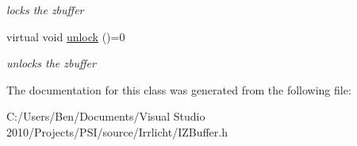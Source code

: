 \begin{DoxyCompactItemize}
\begin{DoxyCompactList}\small\item\em locks the zbuffer \end{DoxyCompactList}\item 
\hypertarget{classirr_1_1video_1_1_i_z_buffer_a08ac4fd389bc59d3b5bdf22055b3127d}{virtual void \hyperlink{classirr_1_1video_1_1_i_z_buffer_a08ac4fd389bc59d3b5bdf22055b3127d}{unlock} ()=0}\label{classirr_1_1video_1_1_i_z_buffer_a08ac4fd389bc59d3b5bdf22055b3127d}

\begin{DoxyCompactList}\small\item\em unlocks the zbuffer \end{DoxyCompactList}\end{DoxyCompactItemize}


The documentation for this class was generated from the following file\-:\begin{DoxyCompactItemize}
\item 
C\-:/\-Users/\-Ben/\-Documents/\-Visual Studio 2010/\-Projects/\-P\-S\-I/source/\-Irrlicht/I\-Z\-Buffer.\-h\end{DoxyCompactItemize}
